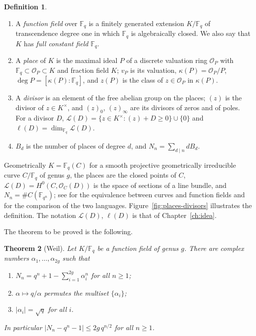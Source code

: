 \documentclass[11pt]{amsbook}
\theoremstyle{plain}
\newtheorem{theorem}{Theorem}[section]
\theoremstyle{definition}
\newtheorem{definition}[theorem]{Definition}
\theoremstyle{remark}
\numberwithin{equation}{section}
\numberwithin{figure}{chapter}
\numberwithin{table}{chapter}
\newcommand{\F}{\mathbb{F}}
\newcommand{\calL}{\mathcal{L}}
\newcommand{\calO}{\mathcal{O}}
\begin{document}
\begin{definition}\label{def:function-field}
\leavevmode
\begin{enumerate}
\item A \emph{function field} over $\F_q$ is a finitely generated
extension $K/\F_q$ of transcendence degree one in which $\F_q$ is
algebraically closed. We also say that $K$ has \emph{full constant
field} $\F_q$.
\item A \emph{place} of $K$ is the maximal ideal $P$ of a discrete
valuation ring $\calO_P$ with $\F_q\subset\calO_P\subset K$ and
fraction field $K$; $v_P$ is its valuation,
$\kappa(P)=\calO_P/P$, $\deg P=[\kappa(P):\F_q]$, and $z(P)$ is the
class of $z\in\calO_P$ in $\kappa(P)$.
\item A \emph{divisor} is an element of the free abelian group on
the places; $(z)$ is the divisor of $z\in K^\times$, and
$(z)_0$, $(z)_\infty$ are its divisors of zeros and of poles. For a
divisor $D$,
$\calL(D)=\{z\in K^\times:(z)+D\ge0\}\cup\{0\}$ and
$\ell(D)=\dim_{\F_q}\calL(D)$.
\item $B_d$ is the number of places of degree $d$, and
$N_n=\sum_{d\mid n}dB_d$.
\end{enumerate}
\end{definition}

Geometrically $K=\F_q(C)$ for a smooth projective geometrically
irreducible curve $C/\F_q$ of genus $g$, the places are the closed
points of $C$, $\calL(D)=H^0(C,\calO_C(D))$ is the space of sections
of a line bundle, and $N_n=\#C(\F_{q^n})$; see
\cite[Theorem~16.3.3]{Vakil2025} for
the equivalence between curves and function fields and
\cite[App.~B]{Stichtenoth2009} for the comparison of the two
languages. Figure~\ref{fig:places-divisors} illustrates the
definition. The notation $\calL(D)$, $\ell(D)$ is that of
Chapter~\ref{ch:idea}.

The theorem to be proved is the following.

\begin{theorem}[Weil]\label{thm:weil}
Let $K/\F_q$ be a function field of genus $g$. There are complex
numbers $\alpha_1,\dots,\alpha_{2g}$ such that
\begin{enumerate}
\item\label{item:weil-count} $N_n=q^n+1-\sum_{i=1}^{2g}\alpha_i^n$
for all $n\ge1$;
\item\label{item:weil-fe} $\alpha\mapsto q/\alpha$ permutes the
multiset $\{\alpha_i\}$;
\item\label{item:weil-rh} $\lvert\alpha_i\rvert=\sqrt q$ for all
$i$.
\end{enumerate}
In particular $\lvert N_n-q^n-1\rvert\le2g\,q^{n/2}$ for all
$n\ge1$.
\end{theorem}
\end{document}
